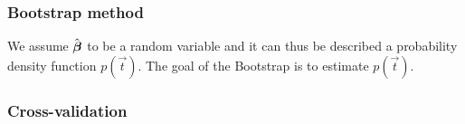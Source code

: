 \subsubsection{Bootstrap method}\label{sec:bootstrap}
We assume $\hat{\boldsymbol{\beta}}$ to be a random variable and it can thus be described a probability density function $p(\vec{t})$. The goal of the Bootstrap is to estimate $p(\vec{t})$. 


\subsubsection{Cross-validation}\label{sec:k_fold}
